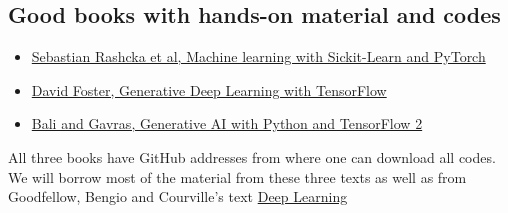 \documentclass[%
oneside,                 %
final,                   %
10pt]{article}
\begin{document}
\vspace{6mm}

\subsection{Good books with hands-on material and codes}
\begin{block}{}
\begin{itemize}
\item \href{{https://sebastianraschka.com/blog/2022/ml-pytorch-book.html}}{Sebastian Rashcka et al, Machine learning with Sickit-Learn and PyTorch}

\item \href{{https://www.oreilly.com/library/view/generative-deep-learning/9781098134174/ch01.html}}{David Foster, Generative Deep Learning with TensorFlow}

\item \href{{https://github.com/PacktPublishing/Hands-On-Generative-AI-with-Python-and-TensorFlow-2}}{Bali and Gavras, Generative AI with Python and TensorFlow 2}
\end{itemize}

\noindent
\end{block}

All three books have GitHub addresses from where  one can download all codes. We will borrow most of the material from these three texts as well as 
from Goodfellow, Bengio and Courville's text \href{{https://www.deeplearningbook.org/}}{Deep Learning}

\end{document}
